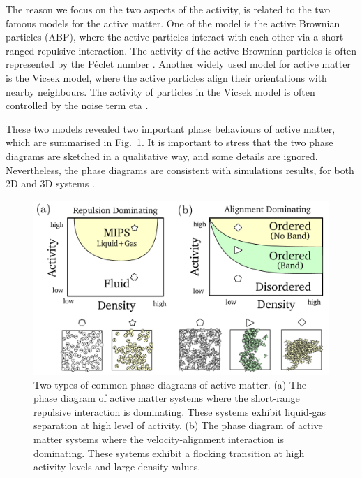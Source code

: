\documentclass[11pt,twoside]{report}
\begin{document}
The reason we focus on the two aspects of the activity, is related to the two famous models for the active matter. One of the model is the active Brownian particles (\gls{ABP}), where the active particles interact with each other via a short-ranged repulsive interaction. The activity of the active Brownian particles is often represented by the Péclet number \cite{romanczuk2012, mauleon-amieva2020, turci2021}. 
Another widely used model for active matter is the Vicsek model, where the active particles align their orientations with nearby neighbours. The activity of particles in the Vicsek model is often controlled by the noise term \gls{eta} \cite{vicsek1995, gregoire2004, pimentel2008}.

These two models revealed two important phase behaviours of active matter, which are summarised in Fig.~\ref{fig:active-phase}. 
It is important to stress that the two phase diagrams are sketched in a qualitative way, and some details are ignored. Nevertheless, the phase diagrams are consistent with simulations results, for both 2D and 3D systems \cite{stenhammar2014, turci2021, vicsek1995, solon2015, chate2020}.


\begin{figure}
  \includegraphics[width=\linewidth]{active-phase}
  \caption[Common phase diagrams of active matter]{
  Two types of common phase diagrams of active matter.
  (a) The phase diagram of active matter systems where the short-range repulsive interaction is dominating. These systems exhibit liquid-gas separation at high level of activity.
  (b) The phase diagram of active matter systems where the velocity-alignment interaction is dominating. These systems exhibit a flocking transition at high activity levels and large density values.
  }
\label{fig:active-phase}
\end{figure}
\end{document}
